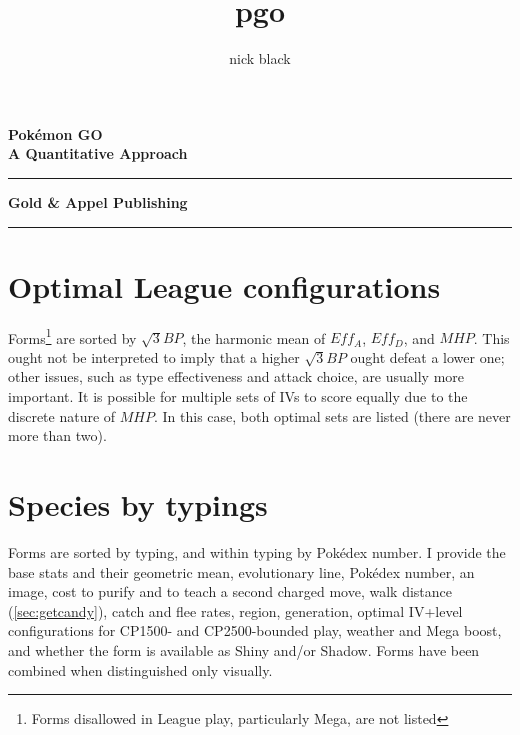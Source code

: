 \documentclass[ebook,10pt,openany,onesided]{memoir}
\title{pgo}
\author{nick black}
\def\LOGO {
  \textbf{
    \Huge Pokémon GO\\
    \Large A Quantitative Approach\\
  }}
\begin{document}
  \pagestyle{empty}
  \begin{center}
  \LOGO
  \vspace{0.5in}
  \end{center}
  \vfill
  \hrule
  \begin{center}
    \textbf{\textsf{Gold \& Appel Publishing}}
  \end{center}
  \hrule
  \clearpage
  \setcounter{page}{1}
  \pagestyle{plain} %

\ifdefined\epub
\else
  \hypertarget{toc}{}%
  \tableofcontents*
  \clearpage
  \hypertarget{lot}{}%
  \listoftables*
  \hypertarget{lof}{}%
  \listoffigures*
  \fi

\mainmatter















\appendix
\chapter{Optimal League configurations}
\label{chap:optimal}
Forms\footnote{Forms disallowed in League play, particularly Mega, are not
  listed} are sorted by $\sqrt{3}{BP}$, the harmonic mean of $Eff_A$, $Eff_D$, and $MHP$.
This ought not be interpreted to imply that a higher $\sqrt{3}{BP}$ ought
  defeat a lower one; other issues, such as type effectiveness and attack
  choice, are usually more important.
It is possible for multiple sets of IVs to score equally due to the discrete nature
  of $MHP$.
In this case, both optimal sets are listed (there are never more than two).


\chapter{Species by typings}
\label{chap:speciesbytype}
Forms are sorted by typing, and within typing by Pokédex number.
I provide the base stats and their geometric mean, evolutionary line,
 Pokédex number, an image, cost to purify and to teach a second charged
 move, walk distance (\autoref{sec:getcandy}), catch and flee rates,
 region, generation, optimal IV+level configurations for CP1500-
 and CP2500-bounded play, weather and Mega boost, and whether the
 form is available as Shiny and/or Shadow.
Forms have been combined when distinguished only visually.
\end{document}
